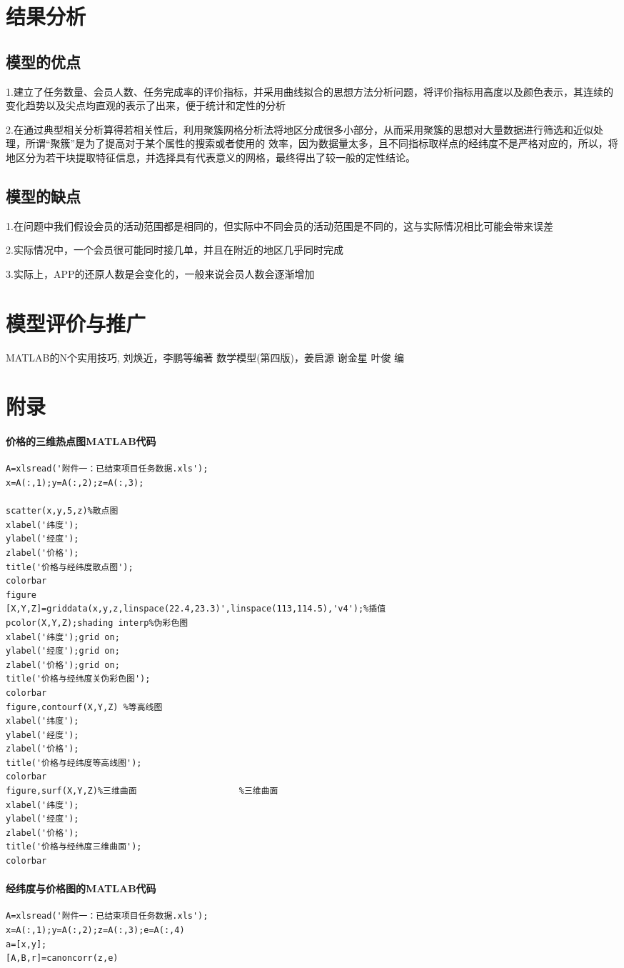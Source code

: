 \documentclass{ctexart}
\begin{document}
\section{结果分析}
\subsection{模型的优点}
1.建立了任务数量、会员人数、任务完成率的评价指标，并采用曲线拟合的思想方法分析问题，将评价指标用高度以及颜色表示，其连续的变化趋势以及尖点均直观的表示了出来，便于统计和定性的分析

2.在通过典型相关分析算得若相关性后，利用聚簇网格分析法将地区分成很多小部分，从而采用聚簇的思想对大量数据进行筛选和近似处理，所谓“聚簇”是为了提高对于某个属性的搜索或者使用的 效率，因为数据量太多，且不同指标取样点的经纬度不是严格对应的，所以，将地区分为若干块提取特征信息，并选择具有代表意义的网格，最终得出了较一般的定性结论。


\subsection{模型的缺点}
1.在问题中我们假设会员的活动范围都是相同的，但实际中不同会员的活动范围是不同的，这与实际情况相比可能会带来误差

2.实际情况中，一个会员很可能同时接几单，并且在附近的地区几乎同时完成

3.实际上，APP的还原人数是会变化的，一般来说会员人数会逐渐增加
\section{模型评价与推广}
\newpage  
\appendix 
\begin{thebibliography}{9}
 MATLAB的N个实用技巧, 刘焕近，李鹏等编著
 数学模型(第四版)，姜启源 谢金星 叶俊 编
\end{thebibliography}
\section{附录}
\paragraph{价格的三维热点图MATLAB代码}
\begin{verbatim}
A=xlsread('附件一：已结束项目任务数据.xls');
x=A(:,1);y=A(:,2);z=A(:,3);

scatter(x,y,5,z)%散点图
xlabel('纬度');
ylabel('经度');
zlabel('价格');
title('价格与经纬度散点图');
colorbar
figure
[X,Y,Z]=griddata(x,y,z,linspace(22.4,23.3)',linspace(113,114.5),'v4');%插值
pcolor(X,Y,Z);shading interp%伪彩色图
xlabel('纬度');grid on;
ylabel('经度');grid on;
zlabel('价格');grid on;
title('价格与经纬度关伪彩色图');
colorbar
figure,contourf(X,Y,Z) %等高线图
xlabel('纬度');
ylabel('经度');
zlabel('价格');
title('价格与经纬度等高线图');
colorbar
figure,surf(X,Y,Z)%三维曲面                    %三维曲面
xlabel('纬度');
ylabel('经度');
zlabel('价格');
title('价格与经纬度三维曲面');
colorbar
\end{verbatim}
\paragraph{经纬度与价格图的MATLAB代码}
\begin{verbatim}
A=xlsread('附件一：已结束项目任务数据.xls');
x=A(:,1);y=A(:,2);z=A(:,3);e=A(:,4)
a=[x,y];
[A,B,r]=canoncorr(z,e)
\end{verbatim}
\end{document}
